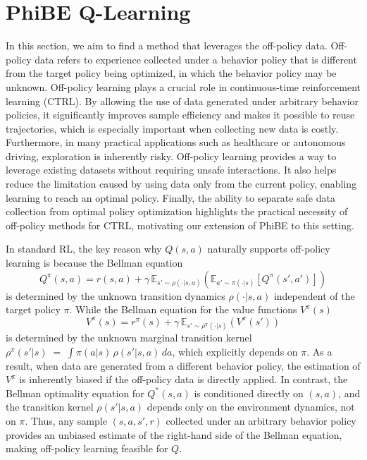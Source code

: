 \documentclass[12pt]{article}
\def\E{\mathbb E}
\def\l{\left}
\def\r{\right}
\begin{document}
\section{PhiBE Q-Learning}\label{sec:off-policy-rl}

In this section, we aim to find a method that leverages the off-policy data. Off-policy data refers to experience collected under a behavior policy that is different from the target policy being optimized, in which the behavior policy may be unknown. Off-policy learning plays a crucial role in continuous-time reinforcement learning (CTRL). By allowing the use of data generated under arbitrary behavior policies, it significantly improves sample efficiency and makes it possible to reuse trajectories, which is especially important when collecting new data is costly. Furthermore, in many practical applications such as healthcare or autonomous driving, exploration is inherently risky. Off-policy learning provides a way to leverage existing datasets without requiring unsafe interactions. It also helps reduce the limitation caused by using data only from the current policy, enabling learning to reach an optimal policy. Finally, the ability to separate safe data collection from optimal policy optimization highlights the practical necessity of off-policy methods for CTRL, motivating our extension of PhiBE to this setting.

In standard RL, the key reason why $Q(s,a)$ naturally supports off-policy learning is because the Bellman equation 
\begin{equation}\label{discrete-time be}
 Q^\pi(s,a) = r(s,a) + \gamma \, \E_{s'\sim \rho(\cdot|s,a)} \l( \E_{a'\sim\pi(\cdot|s) }\l[ Q^\pi(s',a') \r]\r)   
\end{equation}
is determined by the unknown transition dynamics $\rho(\cdot|s,a)$ independent of the target policy $\pi$. While the Bellman equation for the value functions $V^\pi(s)$
\[
V^\pi(s) = r^\pi(s) + \gamma \, \E_{s'\sim \rho^\pi(\cdot|s)} \l( V^\pi(s') \r) 
\]  
is determined by the unknown marginal transition kernel  $\rho^\pi(s'|s) \;=\; \int \pi(a|s)\,\rho(s'|s,a)\, da$, which explicitly depends on $\pi$. As a result, when data are generated from a different behavior policy, the estimation of $V^\pi$ is inherently biased if the off-policy data is directly applied. In contrast, the Bellman optimality equation for $Q^*(s,a)$ is conditioned directly on $(s,a)$, and the transition kernel $\rho(s'|s,a)$ depends only on the environment dynamics, not on $\pi$. Thus, any sample $(s,a,s',r)$ collected under an arbitrary behavior policy provides an unbiased estimate of the right-hand side of the Bellman equation, making off-policy learning feasible for $Q$.  
\end{document}
